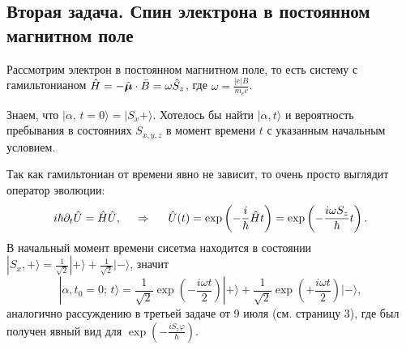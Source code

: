 \subsection*{Вторая задача. Спин электрона в постоянном магнитном поле}

Рассмотрим электрон в постоянном магнитном поле, то есть систему с гамильтонианом $\hat{H} = - \hat{\mbox{\boldmath $\mu$}} \cdot \bar{B} = \omega \hat{S}_z$, где $\omega = \frac{|e| B}{m_e c}$. 

Знаем, что $|\alpha,\, t=0\rangle = |S_x + \rangle $. Хотелось бы найти $| \alpha, t\rangle $ и вероятность пребывания в состояниях $S_{x, y, z}$ в момент времени $t$ с указанным начальным условием.

Так как гамильтониан от времени явно не зависит, то очень просто выглядит оператор эволюции:
\begin{equation*}
    i \hbar \partial_t \hat{U} = \hat{H} \hat{U},
    \hspace{0.5cm} \Rightarrow \hspace{0.5cm}
    \hat{U}(t) = \exp\left(- \frac{i}{\hbar} \hat{H} t\right) 
    =
    \exp\left(- \frac{i \omega S_z}{\hbar} t\right)
    .
\end{equation*}
В начальный момент времени сисетма находится в состоянии $| S_x,+\rangle = \textstyle \frac{1}{\sqrt{2}} | +\rangle + \frac{1}{\sqrt{2}} | -\rangle $, значит
\begin{equation*}
    | \alpha, t_0 = 0;\, t\rangle = \frac{1}{\sqrt{2}} \exp\left(- \frac{i \omega t}{2}\right) | +\rangle + \frac{1}{\sqrt{2}} \exp\left(+ \frac{i \omega t}{2}\right) | -\rangle,
\end{equation*}
аналогично рассуждению в третьей задаче от 9 июля (см. страницу 3), где был получен явный вид для $\exp\left(- \frac{i S_z \varphi}{\hbar}\right)$. 


